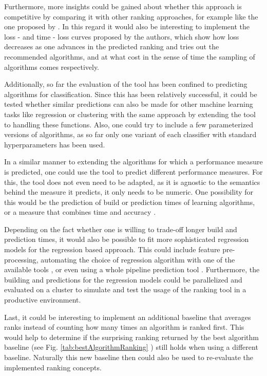 Furthermore, more insights could be gained about whether this approach is competitive by comparing it with other ranking approaches, for example like the one proposed by \citeauthor{DBLP:journals/ml/AbdulrahmanBRV18} \cite{DBLP:journals/ml/AbdulrahmanBRV18}. In this regard it would also be interesting  to implement the loss - and time - loss curves proposed by the authors, which show how loss decreases as one advances in the predicted ranking and tries out the recommended algorithms, and at what cost in the sense of time the sampling of algorithms comes respectively.

Additionally, so far the evaluation of the tool has been confined to predicting algorithms for classification. Since this has been relatively successful, it could be tested whether similar predictions can also be made for other machine learning tasks like regression or clustering with the same approach by extending the tool to handling these functions. Also, one could try to include a few parameterized versions of algorithms, as so far only one variant of each classifier with standard hyperparameters has been used. 

In a similar manner to extending the algorithms for which a performance measure is predicted, one could use the tool to predict different performance measures. For this, the tool does not even need to be adapted, as it is agnostic to the semantics behind the measure it predicts, it only needs to be numeric. One possibility for this would be the prediction of build or prediction times of learning algorithms, or a measure that combines time and accuracy \cite{DBLP:journals/ml/AbdulrahmanBRV18}.

Depending on the fact whether one is willing to trade-off longer build and prediction times, it would also be possible to fit more sophisticated regression models for the regression based approach. This could include feature pre-processing, automating the choice of regression algorithm with one of the available tools \cite{thornton2013auto} \cite{feurer2015efficient}, or even using a whole pipeline prediction tool \cite{wever2017automatic} \cite{DBLP:conf/eurogp/SaPOP17}. Furthermore, the building and predictions for the regression models could be parallelized and evaluated on a cluster to simulate and test  the usage of the ranking tool in a productive environment.

Last, it could be interesting to implement an additional baseline that averages ranks instead of counting how many times an algorithm is ranked first. This would help to determine if the surprising ranking returned by the best algorithm baseline (see Fig. \ref{tab:bestAlgorithmRanking}
) still holds when using a different baseline. Naturally this new baseline then could also be used to re-evaluate the implemented ranking concepts. 


